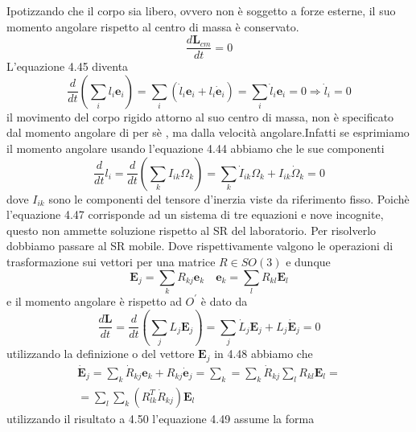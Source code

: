 \noindent Ipotizzando che il corpo sia libero, ovvero non \`{e} soggetto a forze esterne, il suo momento angolare  rispetto al centro di massa \`{e} conservato.
\begin{equation}
	\frac{d\bm{L}_{cm}}{dt} = 0 
\end{equation}
L'equazione 4.45 diventa 
\begin{equation}
	\frac{d}{dt} \left ( \sum_{i} l_i \bm{e}_i \right ) = \sum_{i} \left ( \dot{l}_{i}\bm{e}_i + l_i \bm{\dot{e}}_{i} \right ) = \sum_{i} \dot{l}_{i} \bm{e}_{i} =0 \Rightarrow \dot{l}_i = 0
\end{equation}
il movimento del corpo rigido attorno al suo centro di massa, non \`{e} specificato dal momento angolare di per s\`{e} , ma dalla velocit\`{a} angolare.Infatti se esprimiamo il momento angolare usando l'equazione 4.44 abbiamo che le sue componenti 
\begin{equation}
	\frac{d}{dt}l_i = \frac{d}{dt}\left ( \sum_{k} I_{ik} \Omega_k \right ) = \sum_{k} \dot{I}_{ik}\Omega_k +I_{ik}\dot{\Omega}_k = 0 
\end{equation}
dove $I_{ik}$ sono le componenti del tensore d'inerzia viste da riferimento fisso. Poich\`{e} l'equazione 4.47 corrisponde ad un sistema di tre equazioni e nove incognite, questo non ammette soluzione rispetto al SR del laboratorio. Per risolverlo dobbiamo passare al SR mobile.
Dove rispettivamente valgono le operazioni di trasformazione sui vettori per una matrice $R \in SO(3)$ e dunque 
\begin{equation}
	\bm{E}_j = \sum_{k} R_{kj}\bm{e}_k \quad \bm{e}_{k} = \sum_{l} R_{kl} \bm{E}_{l}
\end{equation}
e il momento angolare \`{e} rispetto ad $O^{\prime}$ \`{e} dato da 
\begin{equation}
	\frac{d \bm{L}}{dt} = \frac{d}{dt} \left (\sum_{j}L_{j}\bm{E}_{j}\right ) = \sum_{j} \dot{L}_{j} \bm{E}_{j} + L_{j}\dot{\bm{E}}_{j} = 0
\end{equation}
utilizzando la definizione o del vettore $\bm{E}_{j}$ in 4.48 abbiamo che 
\begin{equation}
\begin{aligned}
	& \bm{\dot{E}}_{j} = \sum_{k} \dot{R}_{kj} \bm{e}_{k} + R_{kj}\dot{\bm{e}}_j = \sum_{k} = \sum_{k}\dot{R}_{kj} \sum_{l} R_{kl}\bm{E}_{l}= & \\[0.1in]
	& = \sum_{l} \sum_{k} \left ( R^T_{lk} \dot{R}_{kj}\right )\bm{E}_{l}
\end{aligned}
\end{equation}
utilizzando il risultato a 4.50 l'equazione 4.49 assume la forma 
